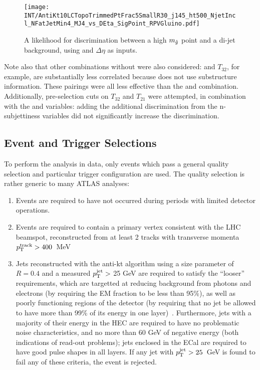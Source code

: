 

\begin{figure}
\centering
\texttt{[image: INT/AntiKt10LCTopoTrimmedPtFrac5SmallR30\_j145\_ht500\_NjetIncl\_NFatJetMin4\_MJ4\_vs\_DEta\_SigPoint\_RPVGluino.pdf]}
\caption{A likelihood for discrimination between a high $m_{\tilde{g}}$ point and a \herwigpp di-jet background, using \MJ and $\Delta \eta$ as inputs.}
\label{fig:search:search:optimization:2D:DETAraw}
\end{figure}



Note also that other combinations without \MJ were also considered: \Ht and $T_{32}$, for example, are substantially less correlated because \Ht does not use substructure information. These pairings were all less effective than the \MJ and \Deta combination. Additionally, pre-selection cuts on $T_{32}$ and $T_{21}$ were attempted, in combination with the \MJ and \Deta variables: adding the additional discrimination from the n-subjettiness variables did not significantly increase the discrimination.


\subsection{Event and Trigger Selections}

\label{chapter:search:search:triggering}
To perform the analysis in data, only events which pass a general quality selection and particular trigger configuration are used. The quality selection is rather generic to many ATLAS analyses:
%
\begin{enumerate}
\item Events are required to have not occurred during periods with limited detector operations.
\item Events are required to contain a primary vertex consistent with the LHC beamspot, reconstructed from at least 2 tracks with transverse momenta $p_{\text{T}}^{\mathrm{track}} > 400$~MeV
\item Jets reconstructed with the anti-kt algorithm using a size parameter of $R = 0.4$ and a measured $p_{\text{T}}^{\mathrm{jet}} >$ 25 GeV are required to satisfy the “looser” requirements, which are targetted at reducing background from photons and electrons (by requiring the EM fraction to be less than 95\%), as well as poorly functioning regions of the detector (by requiring that no jet be allowed to have more than 99\% of its energy in one layer)~\cite{jetquality}. Furthermore, jets with a majority of their energy in the HEC are required to have no problematic noise characteristics, and no more than 60 GeV of negative energy (both indications of read-out problems); jets enclosed in the ECal are required to have good pulse shapes in all layers. If any jet with $p_{\text{T}}^{\mathrm{jet}} > 25$~GeV is found to fail any of these criteria, the event is rejected.
\end{enumerate} 
%

